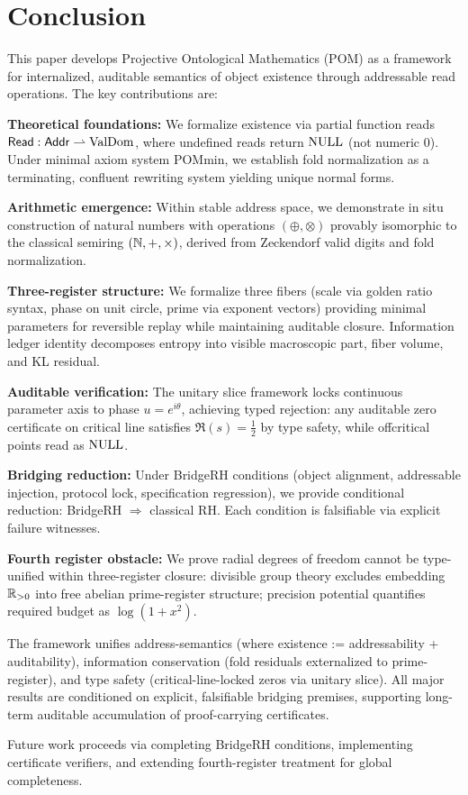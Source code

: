 \section{Conclusion}

This paper develops Projective Ontological Mathematics (POM) as a framework for internalized, auditable semantics of object existence through addressable read operations. The key contributions are:

\textbf{Theoretical foundations:} We formalize existence via partial function reads $\mathsf{Read}:\mathsf{Addr}\rightharpoonup \mathrm{ValDom}$, where undefined reads return $\mathrm{NULL}$ (not numeric 0). Under minimal axiom system POMmin, we establish fold normalization as a terminating, confluent rewriting system yielding unique normal forms.

\textbf{Arithmetic emergence:} Within stable address space, we demonstrate in situ construction of natural numbers with operations $(\oplus,\otimes)$ provably isomorphic to the classical semiring $(\mathbb{N},+,\times)$, derived from Zeckendorf valid digits and fold normalization.

\textbf{Three-register structure:} We formalize three fibers (scale via golden ratio syntax, phase on unit circle, prime via exponent vectors) providing minimal parameters for reversible replay while maintaining auditable closure. Information ledger identity decomposes entropy into visible macroscopic part, fiber volume, and KL residual.

\textbf{Auditable verification:} The unitary slice framework locks continuous parameter axis to phase $u=e^{i\theta}$, achieving typed rejection: any auditable zero certificate on critical line satisfies $\Re(s)=\tfrac12$ by type safety, while offcritical points read as $\mathrm{NULL}$.

\textbf{Bridging reduction:} Under BridgeRH conditions (object alignment, addressable injection, protocol lock, specification regression), we provide conditional reduction: BridgeRH $\Rightarrow$ classical RH. Each condition is falsifiable via explicit failure witnesses.

\textbf{Fourth register obstacle:} We prove radial degrees of freedom cannot be type-unified within three-register closure: divisible group theory excludes embedding $\mathbb{R}_{>0}$ into free abelian prime-register structure; precision potential quantifies required budget as $\log(1+x^2)$.

The framework unifies address-semantics (where existence := addressability + auditability), information conservation (fold residuals externalized to prime-register), and type safety (critical-line-locked zeros via unitary slice). All major results are conditioned on explicit, falsifiable bridging premises, supporting long-term auditable accumulation of proof-carrying certificates.

Future work proceeds via completing BridgeRH conditions, implementing certificate verifiers, and extending fourth-register treatment for global completeness.
